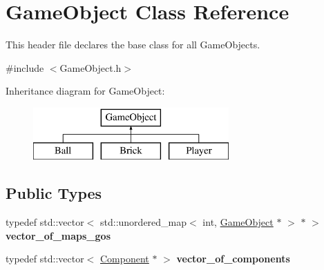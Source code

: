 \hypertarget{class_game_object}{}\section{Game\+Object Class Reference}
\label{class_game_object}


This header file declares the base class for all Game\+Objects.  




{\ttfamily \#include $<$Game\+Object.\+h$>$}

Inheritance diagram for Game\+Object\+:\begin{figure}[H]
\begin{center}
\leavevmode
\includegraphics[height=2.000000cm]{class_game_object}
\end{center}
\end{figure}
\subsection*{Public Types}
\begin{DoxyCompactItemize}
\item 
\hypertarget{class_game_object_aa15598edc0e71df4b2765d036cabaf32}{}typedef std\+::vector$<$ std\+::unordered\+\_\+map$<$ int, \hyperlink{class_game_object}{Game\+Object} $\ast$ $>$ $\ast$ $>$ {\bfseries vector\+\_\+of\+\_\+maps\+\_\+gos}\label{class_game_object_aa15598edc0e71df4b2765d036cabaf32}

\item 
\hypertarget{class_game_object_ab21506a575f86173294bd94b3c7a48d3}{}typedef std\+::vector$<$ \hyperlink{class_component}{Component} $\ast$ $>$ {\bfseries vector\+\_\+of\+\_\+components}\label{class_game_object_ab21506a575f86173294bd94b3c7a48d3}

\end{DoxyCompactItemize}
